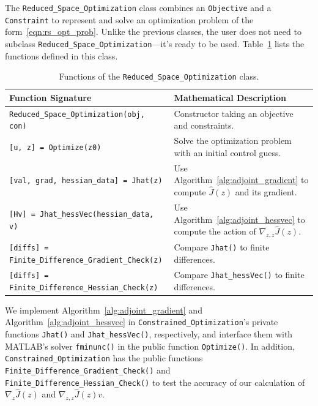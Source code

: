 \documentclass{article}
\begin{document}
The \texttt{Reduced\_Space\_Optimization} class combines an \texttt{Objective} and a \texttt{Constraint} to represent and solve an optimization problem of the form~\eqref{eqn:rs_opt_prob}.
Unlike the previous classes, the user does not need to subclass \texttt{Reduced\_Space\_Optimization}---it's ready to be used.
Table~\ref{tab:optimization_functions} lists the functions defined in this class.

\begin{table}[!ht]
\centering
\begin{tabular}{|l|l|}
    \hline
    Function Signature & Mathematical Description
    \\ \hline
    \texttt{Reduced\_Space\_Optimization(obj, con)}
    & Constructor taking an objective and constraints.
    \\
    \texttt{[u, z] = Optimize(z0)}
    & Solve the optimization problem with an initial control guess.
    \\ \hline
    \texttt{[val, grad, hessian\_data] = Jhat(z)}
    & Use Algorithm~\ref{alg:adjoint_gradient} to compute $\hat{J}(z)$ and its gradient.
    \\
    \texttt{[Hv] = Jhat\_hessVec(hessian\_data, v)}
    & Use Algorithm~\ref{alg:adjoint_hessvec} to compute the action of $\nabla_{z,z}\hat{J}(z)$.
    \\ \hline
    \texttt{[diffs] = Finite\_Difference\_Gradient\_Check(z)}
    & Compare \texttt{Jhat()} to finite differences.
    \\
    \texttt{[diffs] = Finite\_Difference\_Hessian\_Check(z)}
    & Compare \texttt{Jhat\_hessVec()} to finite differences.
    \\ \hline
\end{tabular}
\caption{Functions of the \texttt{Reduced\_Space\_Optimization} class.}
\label{tab:optimization_functions}
\end{table}

We implement Algorithm~\ref{alg:adjoint_gradient} and Algorithm~\ref{alg:adjoint_hessvec} in \texttt{Constrained\_Optimization}'s private functions \texttt{Jhat()} and \texttt{Jhat\_hessVec()}, respectively,  and interface them with MATLAB's solver \texttt{fminunc()} in the public function \texttt{Optimize()}. In addition, \texttt{Constrained\_Optimization} has the public functions \\ \texttt{Finite\_Difference\_Gradient\_Check()} and \texttt{Finite\_Difference\_Hessian\_Check()} to test the accuracy of our calculation of $\nabla_z \hat{J}(z)$ and $\nabla_{z,z} \hat{J}(z)v$.
\end{document}
